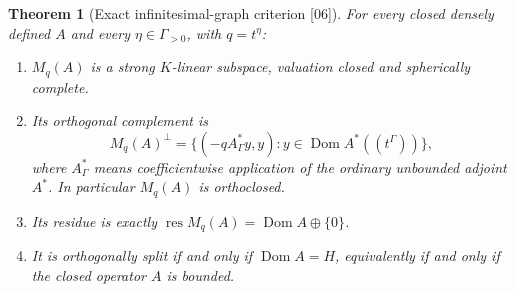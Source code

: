 \documentclass[11pt,letterpaper]{article}
\numberwithin{equation}{section}
\newtheorem{theorem}{Theorem}[section]
\theoremstyle{definition}
\theoremstyle{remark}
\newcommand{\K}{K}
\newcommand{\Dom}{\operatorname{Dom}}
\newcommand{\res}{\operatorname{res}}
\newcommand{\src}[1]{\textup{\textsf{\small[#1]}}}
\begin{document}
\begin{theorem}[Exact infinitesimal-graph criterion \src{06}]
\label{hgeo:thm:unboundedgraph}
For every closed densely defined $A$ and every $\eta\in\Gamma_{>0}$, with
$q=t^\eta$:
\begin{enumerate}[label=\textup{(\roman*)}]
\item $M_q(A)$ is a strong $\K$-linear subspace, valuation closed and
spherically complete.
\item Its orthogonal complement is
\begin{equation}\label{hgeo:eq:graphperp}
 M_q(A)^\perp
 =\{(-qA_\Gamma^*y,y):y\in\Dom A^*((t^\Gamma))\},
\end{equation}
where $A_\Gamma^*$ means coefficientwise application of the ordinary
unbounded adjoint $A^*$. In particular $M_q(A)$ is orthoclosed.
\item Its residue is exactly $\res M_q(A)=\Dom A\oplus\{0\}$.
\item It is orthogonally split if and only if $\Dom A=H$,
equivalently if and only if the closed operator $A$ is bounded.
\end{enumerate}
\end{theorem}
\end{document}

